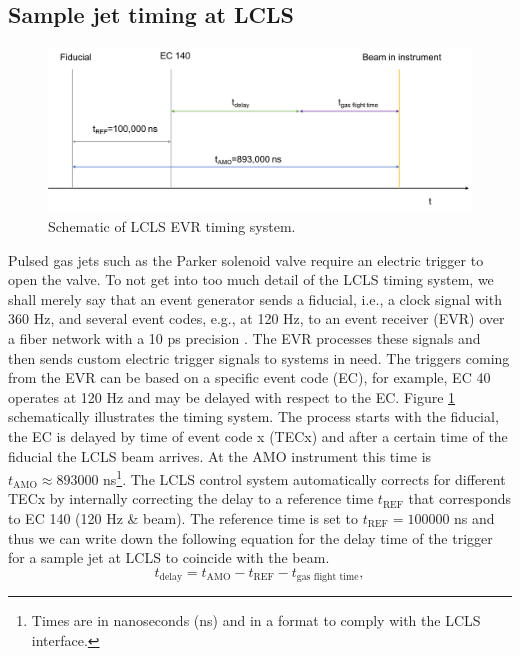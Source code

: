 \subsection{Sample jet timing at LCLS}\label{sec:jet-timing}
\begin{figure}
	\centering
		\includegraphics[width=1.00\textwidth]{images/LCLS-timing-schematic.png}
	\caption{Schematic of LCLS EVR timing system.}
	\label{fig:LCLS-EVR-timing}
\end{figure}
Pulsed gas jets such as the Parker solenoid valve require an electric trigger to open the valve. To not get into too much detail of the LCLS timing system, we shall merely say that an event generator sends a fiducial, i.e., a clock signal with 360 Hz, and several event codes, e.g., at 120 Hz, to an event receiver (EVR) over a fiber network with a 10 ps precision \citep{Krejcik-2007-DIPAC}. The EVR processes these signals and then sends custom electric trigger signals to systems in need. The triggers coming from the EVR can be based on a specific event code (EC), for example, EC 40 operates at 120 Hz and may be delayed with respect to the EC. Figure \ref{fig:LCLS-EVR-timing} schematically illustrates the timing system. The process starts with the fiducial, the EC is delayed by time of event code x (TECx) and after a certain time of the fiducial the LCLS beam arrives. At the AMO instrument this time is $t_{\text{AMO}}\approx 893000$ ns\footnote{Times are in nanoseconds (ns) and in a format to comply with the LCLS interface.}. The LCLS control system automatically corrects for different TECx by internally correcting the delay to a reference time $t_{\text{REF}}$ that corresponds to EC 140 (120 Hz \& beam). The reference time is set to $t_{\text{REF}}=100000$ ns and thus we can write down the following equation for the delay time of the trigger for a sample jet at LCLS to coincide with the beam.
\begin{equation}
t_{\text{delay}} = t_{\text{AMO}} - t_{\text{REF}} - t_{\text{gas flight time}},
\label{eqn:sample-jet-delay-time}
\end{equation}
